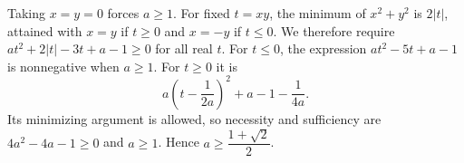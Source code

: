 Taking $x=y=0$ forces $a\ge1$. For fixed $t=xy$, the minimum of $x^2+y^2$ is $2|t|$, attained with $x=y$ if $t\ge0$ and $x=-y$ if $t\le0$. We therefore require $at^2+2|t|-3t+a-1\ge0$ for all real $t$.
For $t\le0$, the expression $at^2-5t+a-1$ is nonnegative when $a\ge1$. For $t\ge0$ it is
\[
a\left(t-\dfrac{1}{2a}\right)^2+a-1-\dfrac{1}{4a}.
\]
Its minimizing argument is allowed, so necessity and sufficiency are $4a^2-4a-1\ge0$ and $a\ge1$. Hence $\boxed{a\ge\dfrac{1+\sqrt2}{2}}$.
